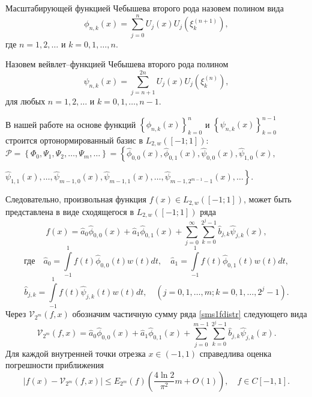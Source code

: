 \begin{definition}
Масштабирующей функцией Чебышева второго рода назовем полином вида
\begin{equation*}
\label{scaling}
\phi_{n,k}(x) = \sum\limits_{j=0}^{n}U_{j}(x)U_{j}(\xi_{k}^{(n+1)}),
\end{equation*}
где
$n=1,2,\ldots$ и $k=0,1,\ldots,n$.
\end{definition}

\begin{definition}
Назовем вейвлет--функцией Чебышева второго рода полином
\begin{equation*}
\label{sms1wavelet}
\psi_{n,k}(x) = \sum\limits_{j=n+1}^{2n}U_{j}(x)U_{j}(\xi_{k}^{(n)}),
\end{equation*}
для любых
$n=1,2,\ldots$ и $k=0,1,\ldots,n-1$.
\end{definition}

В нашей работе \cite{sms11}
на основе функций  $\left\{ \phi_{n,k}(x)\right\}_{k=0}^{n}$ и $\left\{ \psi_{n,k}(x)\right\}_{k=0}^{n-1}$ строится ортонормированный базис в $L_{2, w}([-1; 1])$:
$\mathcal{P} = \left\{\Phi_{0}, \Psi_1, \Psi_2, \ldots, \Psi_m, \ldots \right\} =
\left\{\hat{\phi}_{0,0}(x), \hat{\phi}_{0,1}(x), \hat{\psi}_{0,0}(x), \hat{\psi}_{1,0}(x), \right.$

\noindent$\left. \hat{\psi}_{1,1}(x), \ldots, \hat{\psi}_{m-1,0}(x), \hat{\psi}_{m-1,1}(x), \ldots, \hat{\psi}_{m-1, 2^{m-1}-1}(x), \ldots \right\}.$


Следовательно, произвольная функция $f(x) \in L_{2, w}([-1; 1])$, может быть представлена в виде сходящегося в $L_{2, w}([-1; 1])$ ряда
\begin{equation}
\label{sms1fdistr}
f(x) = \hat{a}_{0}\hat{\phi}_{0,0}(x) + \hat{a}_{1}\hat{\phi}_{0,1}(x) + \sum\limits_{j=0}^{\infty} \sum\limits_{k=0}^{2^j-1} \hat{b}_{j,k}\hat{\psi}_{j,k}(x),
\end{equation}
\begin{equation*}
\label{sms1fcoeffA}
\text{где}\quad \hat{a}_{0} = \int\limits_{-1}^{1} f(t)\hat{\phi}_{0,0}(t)w(t)dt, \quad \hat{a}_{1} = \int\limits_{-1}^{1} f(t)\hat{\phi}_{0,1}(t)w(t)dt,
\end{equation*}
\begin{equation*}
\label{sms1fcoeffB}
\hat{b}_{j,k} = \int\limits_{-1}^{1} f(t)\hat{\psi}_{j,k}(t)w(t)dt, \quad (j=0,1, \ldots, m; k = 0, 1, \ldots, 2^j-1).
\end{equation*}
Через $\mathcal{V}_{2^m}(f,x)$ обозначим частичную сумму ряда \eqref{sms1fdistr} следующего вида
\begin{equation}
\label{sms1wavepartsum}
\mathcal{V}_{2^m}(f,x) = \hat{a}_{0}\hat{\phi}_{0,0}(x) + \hat{a}_{1}\hat{\phi}_{0,1}(x) + \sum\limits_{j=0}^{m-1} \sum\limits_{k=0}^{2^j-1} \hat{b}_{j,k}\hat{\psi}_{j,k}(x).
\end{equation}
Для каждой внутренней точки отрезка $x \in (-1, 1)$ справедлива оценка погрешности приближения
\begin{equation}
\label{sms1v2mforC}
\left| f(x) - \mathcal{V}_{2^m}(f, x) \right| \leq
E_{2^{m}}(f) \left(\frac{4 \ln{2}}{\pi^2}m + O(1)\right),  \quad f \in C[-1,1].
\end{equation}

